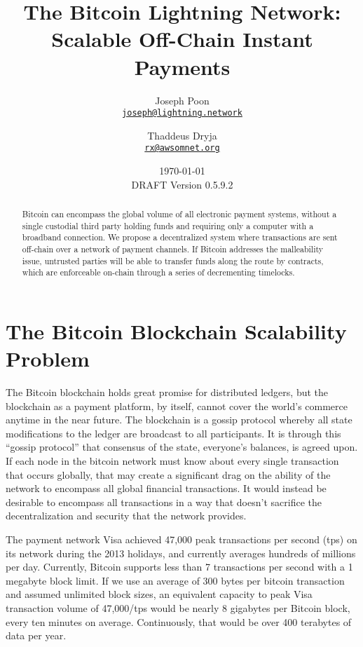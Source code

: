 \documentclass[letterpaper,11pt]{article}
\title{\LARGE The Bitcoin Lightning Network:\\
	\Large Scalable Off-Chain Instant Payments}
\author{
		Joseph Poon\\
		\small\href{mailto:joseph@lightning.network}
			{\nolinkurl{joseph@lightning.network}}
	\and 
		Thaddeus Dryja\\
		\small\href{mailto:rx@awsomnet.org}
			{\nolinkurl{rx@awsomnet.org}}
	}
\date{\today\\\small DRAFT Version 0.5.9.2}
\begin{document}
\maketitle

\begin{abstract}

Bitcoin can encompass the global volume of all electronic payment systems, 
without a single custodial third party holding funds and requiring only a 
computer with a broadband connection. We propose a decentralized system where
transactions are sent off-chain over a network of payment channels. If Bitcoin 
addresses the malleability issue, untrusted parties will be able to transfer 
funds along the route by contracts, which are enforceable on-chain through a 
series of decrementing timelocks.

\end{abstract}

\section{The Bitcoin Blockchain Scalability Problem}

The Bitcoin\cite{nakamoto} blockchain holds great promise for distributed
ledgers, but the blockchain as a payment platform, by itself, cannot cover the
world's commerce anytime in the near future. The blockchain is a gossip
protocol whereby all state modifications to the ledger are broadcast to all
participants. It is through this ``gossip protocol'' that consensus of the
state, everyone's balances, is agreed upon. If each node in the bitcoin network
must know about every single transaction that occurs globally, that may create
a significant drag on the ability of the network to encompass all global
financial transactions. It would instead be desirable to encompass all
transactions in a way that doesn't sacrifice the decentralization and security
that the network provides.

The payment network Visa achieved 47,000 peak transactions per second (tps) on
its network during the 2013 holidays\cite{visa}, and currently averages hundreds
of millions per day. Currently, Bitcoin supports less than 7 transactions per
second with a 1 megabyte block limit. If we use an average of 300 bytes per
bitcoin transaction and assumed unlimited block sizes, an equivalent capacity to
peak Visa transaction volume of 47,000/tps would be nearly 8 gigabytes per
Bitcoin block, every ten minutes on average. Continuously, that would be over
400 terabytes of data per year.
\end{document}
